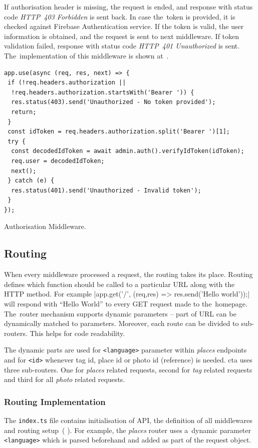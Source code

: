 If authorisation header is missing, the request is ended, and response with status code \textit{HTTP~403 Forbidden} is sent back. In case the~token is provided, it is checked against Firebase Authentication service. If the token is valid, the user information is obtained, and the request is sent to next middleware. If token validation failed, response with status code \textit{HTTP~401 Unauthorized} is sent. The~implementation of this middleware is shown at~.

\begin{listing}[ht]
\begin{verbatim}
app.use(async (req, res, next) => {
 if (!req.headers.authorization || 
  !req.headers.authorization.startsWith('Bearer ')) {
  res.status(403).send('Unauthorized - No token provided');
  return;
 }
 const idToken = req.headers.authorization.split('Bearer ')[1];
 try {
  const decodedIdToken = await admin.auth().verifyIdToken(idToken);
  req.user = decodedIdToken;
  next();
 } catch (e) {
  res.status(401).send('Unauthorized - Invalid token');
 }
});
\end{verbatim}
\caption{Authorisation Middleware.}
\label{listing:cta-auth-middleware}
\end{listing}

\subsection{Routing}
When every middleware processed a request, the routing takes its place. Routing defines which function should be called to a particular URL along with the HTTP method. For example |app.get('/', (req,res) => res.send('Hello world'));| will respond with ``Hello World'' to every GET request made to the~homepage. The~router mechanism supports dynamic parameters -- part of URL can be dynamically matched to parameters. Moreover, each route can be divided to sub-routers. This helps for code readability. 

The dynamic parts are used for \verb|<language>| parameter within \textit{places} endpoints and for \verb|<id>| whenever tag id, place id or photo id (reference) is needed. \gls{cta} uses three sub-routers. One for \textit{places} related requests, second for \textit{tag} related requests and third for all \textit{photo} related requests.

\subsubsection{Routing Implementation}
The \verb|index.ts| file contains initialisation of API, the definition of all middlewares and routing setup~(
). For example, the \textit{places} router uses a~dynamic parameter \verb|<language>| which is parsed beforehand and added as part of the request object.

